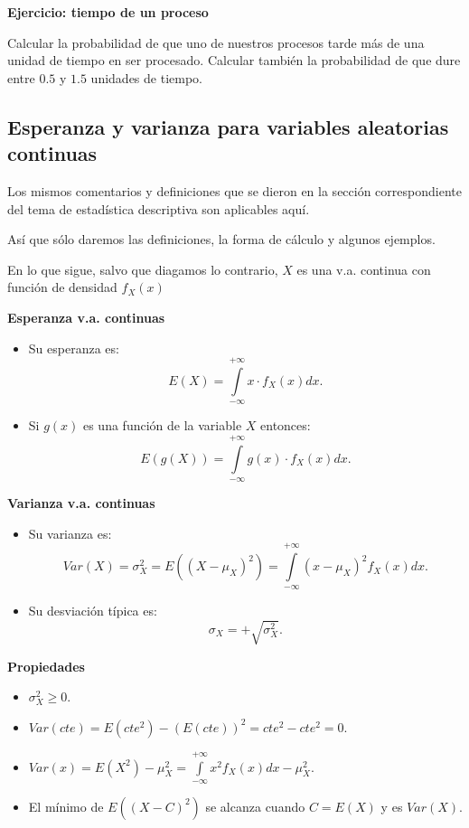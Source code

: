 \documentclass[
  letterpaper,
  DIV=11,
  numbers=noendperiod]{scrreprt}
\providecommand{\tightlist}{%
  \setlength{\itemsep}{0pt}\setlength{\parskip}{0pt}}\usepackage{longtable,booktabs,array}
\begin{document}
\textbf{Ejercicio: tiempo de un proceso}

Calcular la probabilidad de que uno de nuestros procesos tarde más de
una unidad de tiempo en ser procesado. Calcular también la probabilidad
de que dure entre \(0.5\) y \(1.5\) unidades de tiempo.

\hypertarget{esperanza-y-varianza-para-variables-aleatorias-continuas}{%
\subsection{Esperanza y varianza para variables aleatorias
continuas}\label{esperanza-y-varianza-para-variables-aleatorias-continuas}}

Los mismos comentarios y definiciones que se dieron en la sección
correspondiente del tema de estadística descriptiva son aplicables aquí.

Así que sólo daremos las definiciones, la forma de cálculo y algunos
ejemplos.

En lo que sigue, salvo que diagamos lo contrario, \(X\) es una v.a.
continua con función de densidad \(f_{X}(x)\)

\textbf{Esperanza v.a. continuas}

\begin{itemize}
\tightlist
\item
  Su esperanza es:
  \[E(X)=\displaystyle\int\limits_{-\infty}^{+\infty} x\cdot f_{X}(x)dx.\]
\item
  Si \(g(x)\) es una función de la variable \(X\) entonces:
  \[E(g(X))=\displaystyle\int\limits_{-\infty}^{+\infty} g(x)\cdot f_{X}(x)dx.\]
\end{itemize}

\textbf{Varianza v.a. continuas}

\begin{itemize}
\tightlist
\item
  Su varianza es: \[
  Var(X)=\sigma_{X}^2=E((X-\mu_{X})^2)=
  \displaystyle\int\limits_{-\infty}^{+\infty} (x-\mu_{X})^2 f_{X}(x)dx.
  \]
\item
  Su desviación típica es: \[\sigma_{X}=+\sqrt{\sigma_{X}^2}.\]
\end{itemize}

\textbf{Propiedades}

\begin{itemize}
\tightlist
\item
  \(\sigma_{X}^2\geq 0\).
\item
  \(Var(cte)=E(cte^2)-(E(cte))^2= cte^2 - cte^2=0\).
\item
  \(\displaystyle Var(x)=E(X^2)-\mu_{X}^2=\int\limits_{-\infty}^{+\infty}x^2 f_{X}(x)dx - \mu_{X}^2.\)
\item
  El mínimo de \(E((X-C)^2)\) se alcanza cuando \(C=E(X)\) y es
  \(Var(X)\).
\end{itemize}
\end{document}
